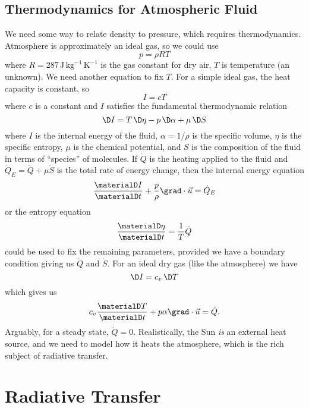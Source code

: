 \subsection{Thermodynamics for Atmospheric Fluid}
We need some way to relate density to pressure, which requires
thermodynamics. Atmosphere is approximately an ideal gas, so we could
use
\begin{equation}
  p = \rho R T
\end{equation}
where $R=287\,\mathrm{J}\,\mathrm{kg}^{-1}\,\mathrm{K}^{-1}$ is the gas
constant for dry air, $T$ is temperature (an unknown). We need another
equation to fix $T$. For a simple ideal gas, the heat capacity is
constant, so
\begin{equation}
  I = cT
\end{equation}
where $c$ is a constant and $I$ satisfies the fundamental thermodynamic
relation
\begin{equation}
  \D I = T\,\D\eta - p\,\D\alpha + \mu\,\D S
\end{equation}
where $I$ is the internal energy of the fluid, $\alpha=1/\rho$ is the
specific volume, $\eta$ is the specific entropy, $\mu$ is the chemical
potential, and $S$ is the composition of the fluid in terms of
``species'' of molecules. If $\dot{Q}$ is the heating applied to the
fluid and $\dot{Q}_{E} = \dot{Q} + \mu\dot{S}$ is the total rate of
energy change, then the internal energy equation
\begin{equation}
  \frac{\materialD I}{\materialD t} + \frac{p}{\rho}\grad\cdot\vec{u} = \dot{Q}_{E}
\end{equation}
or the entropy equation
\begin{equation}
\frac{\materialD \eta}{\materialD t} = \frac{1}{T}\dot{Q}
\end{equation}
could be used to fix the remaining parameters, provided we have a
boundary condition giving us $\dot{Q}$ and $\dot{S}$. For an ideal dry
gas (like the atmosphere) we have
\begin{equation}
  \D I = c_{v}\,\D T
\end{equation}
which gives us
\begin{equation}
c_{v}\frac{\materialD T}{\materialD t} + p\alpha\grad\cdot\vec{u} = \dot{Q}.
\end{equation}
Arguably, for a steady state, $\dot{Q}=0$. Realistically, the Sun
\emph{is} an external heat source, and we need to model how it heats the
atmosphere, which is the rich subject of radiative transfer.

\section{Radiative Transfer}

